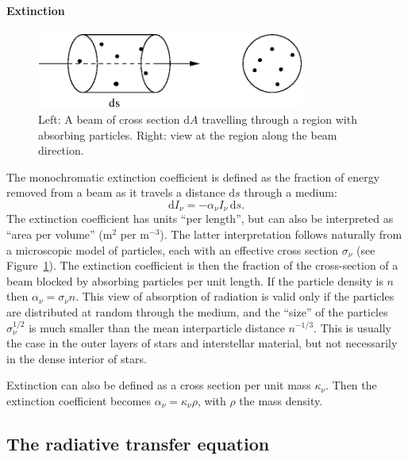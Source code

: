 \documentclass[12pt]{article}
\numberwithin{equation}{section}
\def\dd{\mathrm{d}}
\def\Inu{\ensuremath{I_{\nu}}}
\def\anu{\ensuremath{\alpha_{\nu}}}
\def\ds{\ensuremath{\dd s}}
\newcommand{\be}{\begin{equation}}
\newcommand{\ee}{\end{equation}}
\begin{document}
\paragraph{Extinction} 

  \begin{figure}
   \includegraphics[width=8.8cm]{figs/extinction_def}
    \caption{Left: A beam of cross section $\dd A$ travelling through a region with absorbing particles. Right: view at the region along the beam direction. \label{fig:extinction_def}}
    \end{figure}

The monochromatic extinction coefficient is defined as the fraction of energy removed from a beam as it travels a distance $\ds$ through a medium:
\be
\dd \Inu = - \anu \Inu \, \ds.
\ee
The extinction coefficient has units ``per length'', but can also be interpreted as ``area per volume'' (m$^2$ per m$^{-3}$). The latter interpretation follows naturally from a microscopic model of particles, each with an effective cross section $\sigma_\nu$ (see Figure~\ref{fig:extinction_def}). The extinction coefficient is then the fraction of the cross-section of a beam blocked by absorbing particles per unit length. If the particle density is $n$ then $\anu = \sigma_\nu n$.  This view of absorption of radiation is valid only if the particles are distributed at random through the medium, and the ``size'' of the particles $\sigma_\nu^{1/2}$ is much smaller than the mean interparticle distance $n^{-1/3}$. This is usually the case in the outer layers of stars and interstellar material, but not necessarily in the dense interior of stars.

Extinction can also be defined as a cross section per unit mass $\kappa_\nu$.  Then the extinction coefficient becomes $\anu = \kappa_\nu \rho$, with $\rho$ the mass density.

\subsection{The radiative transfer equation}
\end{document}
